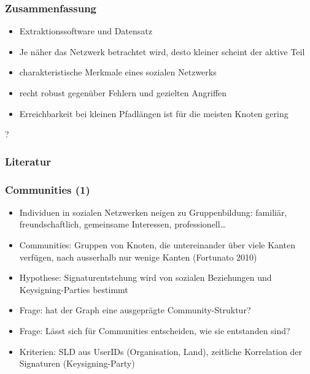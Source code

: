 \documentclass[10pt]{beamer}
\begin{document}
\begin{frame}
  \frametitle{Zusammenfassung}
  \begin{itemize}
  \item Extraktionssoftware und Datensatz
  \item Je n\"aher das Netzwerk betrachtet wird, desto kleiner scheint
    der aktive Teil
  \item charakteristische Merkmale eines sozialen Netzwerks
  \item recht robust gegen\"uber Fehlern und gezielten Angriffen
  \item Erreichbarkeit bei kleinen Pfadl\"angen ist f\"ur die meisten
    Knoten gering
  \end{itemize}
\end{frame}


\begin{frame}
  \begin{center}
    {\Huge ?}
  \end{center}
  
\end{frame}

\begin{frame}
\nocite{PhysRevE.68.036122}
\nocite{Clauset2009}
\nocite{Albert2000}
\nocite{Fortunato2010}
  \frametitle{Literatur}
  
  {\small
  
  
}
\end{frame}

\begin{frame}
  \frametitle{Communities (1)}
  \begin{itemize}
  \item Individuen in sozialen Netzwerken neigen zu Gruppenbildung:
    famili\"ar, freundschaftlich, gemeinsame Interessen,
    professionell\dots
  \item Communities: Gruppen von Knoten, die untereinander \"uber
    viele Kanten verf\"ugen, nach ausserhalb nur wenige Kanten
    (Fortunato 2010)
  \item Hypothese: Signaturentstehung wird von sozialen Beziehungen
    und Keysigning-Parties bestimmt
  \item Frage: hat der Graph eine ausgepr\"agte Community-Struktur?
  \item Frage: L\"asst sich f\"ur Communities entscheiden, wie sie
    entstanden sind?
  \item Kriterien: SLD aus UserIDs (Organisation, Land), zeitliche
    Korrelation der Signaturen (Keysigning-Party)
  \end{itemize}
  
\end{frame}
\end{document}
